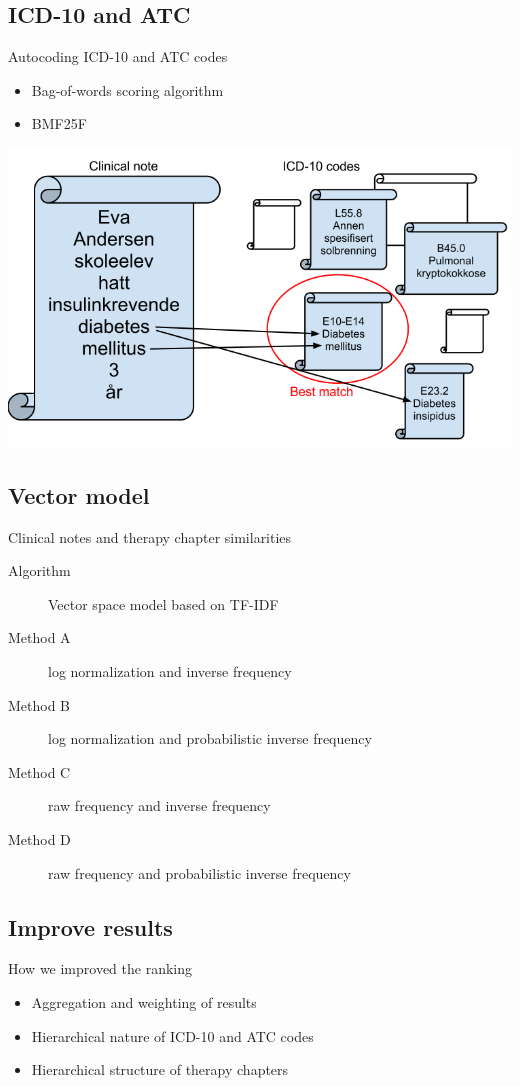 \documentclass[screen, compress]{beamer}
\begin{document}
\subsection{ICD-10 and ATC}
\begin{frame}{Autocoding ICD-10 and ATC codes} %
\LARGE
\begin{itemize}
	\item Bag-of-words scoring algorithm
	\item BMF25F
\end{itemize}
\includegraphics[width=\textwidth,height=0.7\textheight]{img/bagofwords}
\end{frame}

\subsection{Vector model}
\begin{frame}{Clinical notes and therapy chapter similarities} %
\Large
\begin{description}
	\item[Algorithm] Vector space model based on TF-IDF
	\item[Method A] log normalization and inverse frequency
	\item[Method B] log normalization and probabilistic inverse frequency
	\item[Method C] raw frequency and inverse frequency
	\item[Method D] raw frequency and probabilistic inverse frequency
\end{description}
\end{frame}

\subsection{Improve results}
\begin{frame}{How we improved the ranking} %
\Large
\begin{itemize}
	\item Aggregation and weighting of results
	\item Hierarchical nature of ICD-10 and ATC codes
	\item Hierarchical structure of therapy chapters
\end{itemize}
\end{frame}
\end{document}
